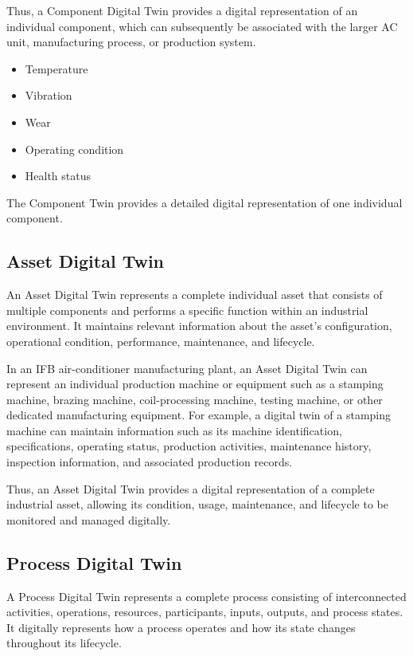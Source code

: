 \documentclass[12pt,a4paper]{article}
\begin{document}
Thus, a Component Digital Twin provides a digital representation of an individual component, which can subsequently be associated with the larger AC unit, manufacturing process, or production system.

\begin{itemize}
    \item Temperature
    \item Vibration
    \item Wear
    \item Operating condition
    \item Health status
\end{itemize}

The Component Twin provides a detailed digital representation of
one individual component.

\subsection{Asset Digital Twin}

An Asset Digital Twin represents a complete individual asset that consists of multiple components and performs a specific function within an industrial environment. It maintains relevant information about the asset's configuration, operational condition, performance, maintenance, and lifecycle.

In an IFB air-conditioner manufacturing plant, an Asset Digital Twin can represent an individual production machine or equipment such as a stamping machine, brazing machine, coil-processing machine, testing machine, or other dedicated manufacturing equipment. For example, a digital twin of a stamping machine can maintain information such as its machine identification, specifications, operating status, production activities, maintenance history, inspection information, and associated production records.

Thus, an Asset Digital Twin provides a digital representation of a complete industrial asset, allowing its condition, usage, maintenance, and lifecycle to be monitored and managed digitally.

\subsection{Process Digital Twin}

A Process Digital Twin represents a complete process consisting of interconnected activities, operations, resources, participants, inputs, outputs, and process states. It digitally represents how a process operates and how its state changes throughout its lifecycle.
\end{document}
